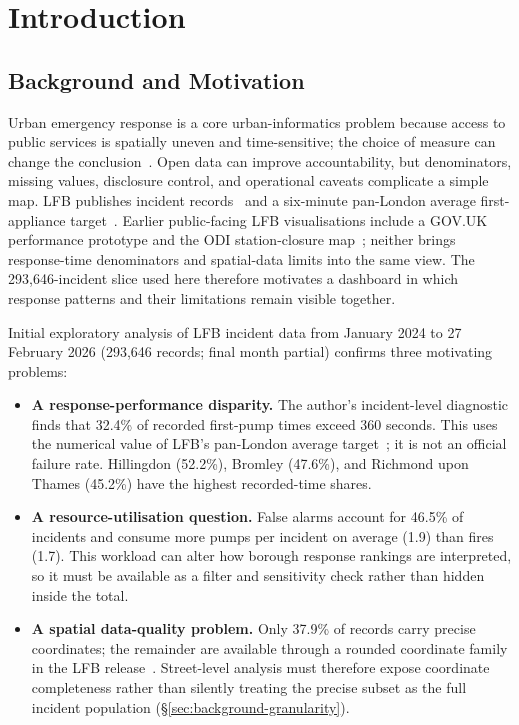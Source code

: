\section{Introduction}

\subsection{Background and Motivation}

Urban emergency response is a core urban-informatics problem because access to public services is spatially uneven and time-sensitive; the choice of measure can change the conclusion~\cite{talen1998,pereira2017equity}. Open data can improve accountability, but denominators, missing values, disclosure control, and operational caveats complicate a simple map. LFB publishes incident records~\cite{lfb_incidents} and a six-minute pan-London average first-appliance target~\cite{lfb_attendance}. Earlier public-facing LFB visualisations include a GOV.UK performance prototype and the ODI station-closure map~\cite{govuk2014,odi2013}; neither brings response-time denominators and spatial-data limits into the same view. The 293{,}646-incident slice used here therefore motivates a dashboard in which response patterns and their limitations remain visible together.

Initial exploratory analysis of LFB incident data from January 2024 to 27 February 2026 (293{,}646 records; final month partial) confirms three motivating problems:

\begin{itemize}
    \item \textbf{A response-performance disparity.} The author's incident-level diagnostic finds that 32.4\% of recorded first-pump times exceed 360 seconds. This uses the numerical value of LFB's pan-London average target~\cite{lfb_attendance}; it is not an official failure rate. Hillingdon (52.2\%), Bromley (47.6\%), and Richmond upon Thames (45.2\%) have the highest recorded-time shares.
    \item \textbf{A resource-utilisation question.} False alarms account for 46.5\% of incidents and consume more pumps per incident on average (1.9) than fires (1.7). This workload can alter how borough response rankings are interpreted, so it must be available as a filter and sensitivity check rather than hidden inside the total.
    \item \textbf{A spatial data-quality problem.} Only 37.9\% of records carry precise coordinates; the remainder are available through a rounded coordinate family in the LFB release~\cite{lfb_incidents}. Street-level analysis must therefore expose coordinate completeness rather than silently treating the precise subset as the full incident population (\S\ref{sec:background-granularity}).
\end{itemize}

